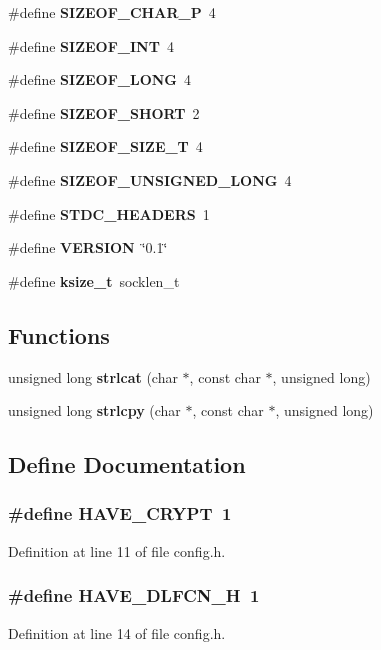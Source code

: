 \begin{CompactItemize}
\item 
\#define {\bf SIZEOF\_\-CHAR\_\-P}\ 4
\item 
\#define {\bf SIZEOF\_\-INT}\ 4
\item 
\#define {\bf SIZEOF\_\-LONG}\ 4
\item 
\#define {\bf SIZEOF\_\-SHORT}\ 2
\item 
\#define {\bf SIZEOF\_\-SIZE\_\-T}\ 4
\item 
\#define {\bf SIZEOF\_\-UNSIGNED\_\-LONG}\ 4
\item 
\#define {\bf STDC\_\-HEADERS}\ 1
\item 
\#define {\bf VERSION}\ \char`\"{}0.1\char`\"{}
\item 
\#define {\bf ksize\_\-t}\ socklen\_\-t
\end{CompactItemize}
\subsection*{Functions}
\begin{CompactItemize}
\item 
unsigned long {\bf strlcat} (char $\ast$, const char $\ast$, unsigned long)
\item 
unsigned long {\bf strlcpy} (char $\ast$, const char $\ast$, unsigned long)
\end{CompactItemize}


\subsection{Define Documentation}
\subsubsection{\setlength{\rightskip}{0pt plus 5cm}\#define HAVE\_\-CRYPT\ 1}\label{config_8h_a0}




Definition at line 11 of file config.h.
\subsubsection{\setlength{\rightskip}{0pt plus 5cm}\#define HAVE\_\-DLFCN\_\-H\ 1}\label{config_8h_a1}




Definition at line 14 of file config.h.
